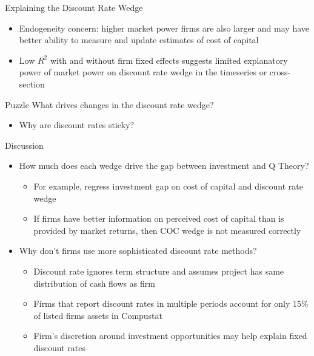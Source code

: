 \documentclass[aspectratio=169]{beamer}
\begin{document}
\begin{frame}{Explaining the Discount Rate Wedge}
    \begin{footnotesize}
        \footnotesize
        
    \end{footnotesize}
\begin{itemize}
    \item Endogeneity concern: higher market power firms are also larger and may have better ability to measure and update estimates of cost of capital
    \item Low $R^2$ with and without firm fixed effects suggests limited explanatory power of market power on discount rate wedge in the timeseries or cross-section 
\end{itemize}
\begin{alertblock}{Puzzle}
    What drives changes in the discount rate wedge?
\end{alertblock}
\begin{itemize}
    \item Why are discount rates sticky?
\end{itemize}
\end{frame}

\begin{frame}{Discussion}
    \begin{itemize}
        \item How much does each wedge drive the gap between investment and Q Theory?
        \begin{itemize}
            \item For example, regress investment gap on cost of capital and discount rate wedge
            \item If firms have better information on perceived cost of capital than is provided by market returns, then COC wedge is not measured correctly
        \end{itemize}
        \vspace{0.3cm}
        \item Why don't firms use more sophisticated discount rate methods?
        \begin{itemize}
            \item Discount rate ignores term structure and assumes project has same distribution of cash flows as firm
            \item Firms that report discount rates in multiple periods account for only 15\% of listed firms assets in Compustat
            \item Firm's discretion around investment opportunities may help explain fixed discount rates
        \end{itemize}
    \end{itemize}
\end{frame}
\end{document}

